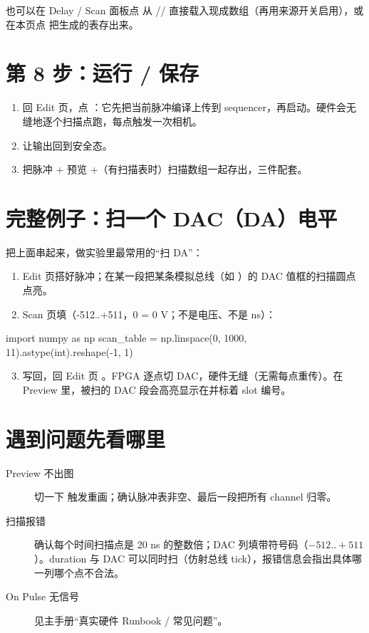 \documentclass[11pt,oneside,openany]{book}
\begin{document}
也可以在 Delay / Scan 面板点  从 // 直接载入现成数组（再用来源开关启用），或在本页点  把生成的表存出来。

\section{第 8 步：运行 / 保存}
\begin{enumerate}
  \item 回 Edit 页，点 ：它先把当前脉冲编译上传到 sequencer，再启动。硬件会无缝地逐个扫描点跑，每点触发一次相机。
  \item {} 让输出回到安全态。
  \item {} 把脉冲  + 预览  +（有扫描表时）扫描数组一起存出，三件配套。
\end{enumerate}

\section{完整例子：扫一个 DAC（DA）电平}
把上面串起来，做实验里最常用的“扫 DA”：
\begin{enumerate}
  \item Edit 页搭好脉冲；在某一段把某条模拟总线（如 ）的 DAC 值框的扫描圆点点亮。
  \item Scan 页填（-512..+511，0 = 0 V；不是电压、不是 ns）：
\end{enumerate}

\begin{codeblock}
import numpy as np
scan_table = np.linspace(0, 1000, 11).astype(int).reshape(-1, 1)
\end{codeblock}

\begin{enumerate}
  \setcounter{enumi}{2}
  \item {} 写回，回 Edit 页 。FPGA 逐点切 DAC，硬件无缝（无需每点重传）。在 Preview 里，被扫的 DAC 段会高亮显示在并标着 slot 编号。
\end{enumerate}

\section{遇到问题先看哪里}
\begin{description}
  \item[Preview 不出图] 切一下  触发重画；确认脉冲表非空、最后一段把所有 channel 归零。
  \item[扫描报错] 确认每个时间扫描点是 20 ns 的整数倍；DAC 列填带符号码（$-512..+511$）。duration 与 DAC 可以同时扫（仿射总线 tick），报错信息会指出具体哪一列哪个点不合法。
  \item[On Pulse 无信号] 见主手册“真实硬件 Runbook / 常见问题”。
\end{description}
\end{document}
